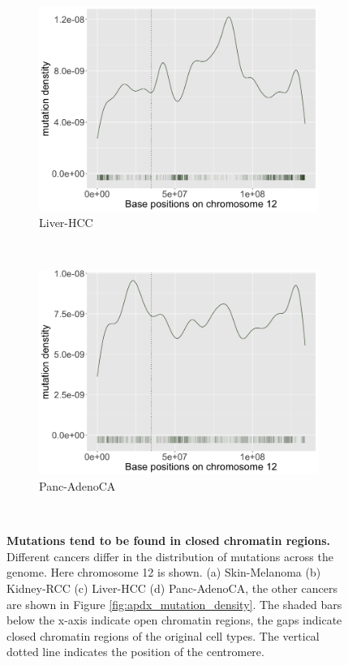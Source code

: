\begin{figure}[ht!]
    \begin{subfigure}{.5\textwidth}
    \includegraphics[width=\linewidth,height=0.7\textwidth]{graphics/mutdistribution_Liver-HCC.png}
    \caption{Liver-HCC}
    \label{fig:density_liver}
    \end{subfigure}
    ~
    \begin{subfigure}{.5\textwidth}
    \includegraphics[width=\linewidth,height=0.7\textwidth]{graphics/mutdistribution_Panc-AdenoCA.png}
    \caption{Panc-AdenoCA}
    \label{fig:density_panc_adenoca}
    \end{subfigure} \\
    
    \caption{\textbf{Mutations tend to be found in closed chromatin regions.} Different cancers differ in the distribution of mutations across the genome. Here chromosome 12 is shown. (a) Skin-Melanoma (b) Kidney-RCC (c) Liver-HCC (d) Panc-AdenoCA, the other cancers are shown in Figure \ref{fig:apdx_mutation_density}. The shaded bars below the x-axis indicate open chromatin regions, the gaps indicate closed chromatin regions of the original cell types. The vertical dotted line indicates the position of the centromere.}
    \label{fig:mutation_density}
\end{figure}